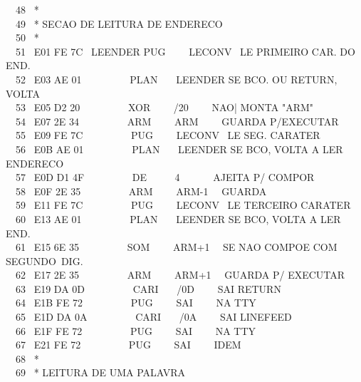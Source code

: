 \documentclass[a4paper,12pt]{article}
\begin{document}
\phantom \ \ 48 \ *\\
\phantom \ \ 49 \ * SECAO DE LEITURA DE ENDERECO\\
\phantom \ \ 50 \ *\\
\phantom \ \ 51 \ E01 FE 7C \ LEENDER PUG \ \ \ \ LECONV \ LE PRIMEIRO CAR. DO END.\\
\phantom \ \ 52 \ E03 AE 01 \ \ \ \ \ \ \ \ \ PLAN \ \ \ LEENDER SE BCO. OU RETURN, VOLTA\\
\phantom \ \ 53 \ E05 D2 20 \ \ \ \ \ \ \ \ \ XOR \ \ \ \ /20 \ \ \ \ NAO| MONTA "ARM"\\
\phantom \ \ 54 \ E07 2E 34 \ \ \ \ \ \ \ \ \ ARM \ \ \ \ ARM \ \ \ \ GUARDA P/EXECUTAR\\
\phantom \ \ 55 \ E09 FE 7C \ \ \ \ \ \ \ \ \ PUG \ \ \ \ LECONV \ LE SEG. CARATER\\
\phantom \ \ 56 \ E0B AE 01 \ \ \ \ \ \ \ \ \ PLAN \ \ \ LEENDER SE BCO, VOLTA A LER ENDERECO\\
\phantom \ \ 57 \ E0D D1 4F \ \ \ \ \ \ \ \ \ DE \ \ \ \ \ 4 \ \ \ \ \ \ AJEITA P/ COMPOR\\
\phantom \ \ 58 \ E0F 2E 35 \ \ \ \ \ \ \ \ \ ARM \ \ \ \ ARM-1 \ \ GUARDA\\
\phantom \ \ 59 \ E11 FE 7C \ \ \ \ \ \ \ \ \ PUG \ \ \ \ LECONV \ LE TERCEIRO CARATER\\
\phantom \ \ 60 \ E13 AE 01 \ \ \ \ \ \ \ \ \ PLAN \ \ \ LEENDER SE BCO, VOLTA A LER END.\\
\phantom \ \ 61 \ E15 6E 35 \ \ \ \ \ \ \ \ \ SOM \ \ \ \ ARM+1 \ \ SE NAO COMPOE COM SEGUNDO\,\,\,DIG.\\
\phantom \ \ 62 \ E17 2E 35 \ \ \ \ \ \ \ \ \ ARM \ \ \ \ ARM+1 \ \ GUARDA P/ EXECUTAR\\
\phantom \ \ 63 \ E19 DA 0D \ \ \ \ \ \ \ \ \ CARI \ \ \ /0D \ \ \ \ SAI RETURN\\
\phantom \ \ 64 \ E1B FE 72 \ \ \ \ \ \ \ \ \ PUG \ \ \ \ SAI \ \ \ \ NA TTY\\
\phantom \ \ 65 \ E1D DA 0A \ \ \ \ \ \ \ \ \ CARI \ \ \ /0A \ \ \ \ SAI LINEFEED\\
\phantom \ \ 66 \ E1F FE 72 \ \ \ \ \ \ \ \ \ PUG \ \ \ \ SAI \ \ \ \ NA TTY\\
\phantom \ \ 67 \ E21 FE 72 \ \ \ \ \ \ \ \ \ PUG \ \ \ \ SAI \ \ \ \ IDEM\\
\phantom \ \ 68 \ *\\
\phantom \ \ 69 \ * LEITURA DE UMA PALAVRA

\newpage
\end{document}
